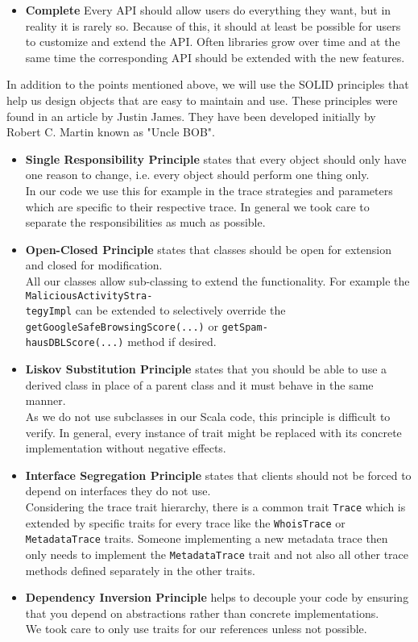 \documentclass[
	a4paper,					10pt,							twoside,					openright,				notitlepage,			parskip=half,			]{scrreprt}
\begin{document}
\begin{itemize}
\item{\textbf{Complete} 
Every \gls{API} should allow users do everything they want, but in reality it is rarely so. 
Because of this, it should at least be possible for users to customize and extend the \gls{API}. 
Often libraries grow over time and at the same time the corresponding \gls{API} should be extended with the new features.}
\end{itemize}

In addition to the points mentioned above, we will use the \gls{SOLID} principles that help us design objects that are easy to maintain and use.
These principles were found in an article by Justin James\cite{solid:principles}. They have
been developed initially by Robert C. Martin known as "Uncle BOB".\cite{solid:unclebob}
\begin{itemize}
\item{\textbf{Single Responsibility Principle} states that every object should only have one reason to change, 
i.e. every object should perform one thing only.\\In our code we use this for example in the trace strategies and parameters which
are specific to their respective trace. In general we took care to separate the responsibilities as much as possible.}
\item{\textbf{Open-Closed Principle} states that classes should be open for extension and closed for modification.
\\All our classes allow sub-classing to extend the functionality. For example the \verb|MaliciousActivityStra-|\\\verb|tegyImpl| can be extended to 
selectively override the \verb|getGoogleSafeBrowsingScore(...)| or \verb|getSpam-|\\\verb|hausDBLScore(...)| method if desired.}
\item{\textbf{Liskov Substitution Principle} states that you should be able to use a derived class in place of a parent class and it must behave in 
the same manner.\\As we do not use subclasses in our Scala code, this principle is difficult to verify. In general, every instance of trait
might be replaced with its concrete implementation without negative effects.}
\item{\textbf{Interface Segregation Principle} states that clients should not be forced to depend on interfaces they do not use.\\
Considering the trace trait hierarchy, there is a common trait \verb|Trace| which is extended by specific traits for every trace 
like the \verb|WhoisTrace| or \verb|MetadataTrace| traits. Someone implementing a new metadata trace then only needs to implement 
the \verb|MetadataTrace| trait and not also all other trace methods defined separately in the other traits.}
\item{\textbf{Dependency Inversion Principle} helps to decouple your code by ensuring that you depend on abstractions rather than concrete implementations.\\
We took care to only use traits for our references unless not possible.}
\end{itemize}
 
\end{document}
